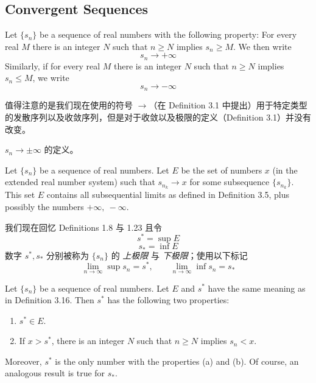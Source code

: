 \documentclass[../poma-notes.tex]{subfiles}
\begin{document}
\subsection*{Convergent Sequences}

\begin{definition}
  Let $\{s_n\}$ be a sequence of real numbers with the following property: For every real $M$ there is an integer $N$ such that $n \ge N$
  implies $s_n \ge M$. We then write
  \[ s_n \to + \infty \]
  Similarly, if for every real $M$ there is an integer $N$ such that $n \ge N$ implies $s_n \le M$, we write
  \[ s_n \to - \infty \]
\end{definition}

值得注意的是我们现在使用的符号 $\to$（在 Definition 3.1 中提出）用于特定类型的发散序列以及收敛序列，但是对于收敛以及极限的定义（Definition 3.1）并没有改变。

\anote $s_n \to \pm \infty$ 的定义。

\begin{definition}
  Let $\{s_n\}$ be a sequence of real numbers. Let $E$ be the set of numbers $x$ (in the extended real number system) such that
  $s_{n_k} \to x$ for some subsequence $\{s_{n_k}\}$. This set $E$ contains all subsequential limits as defined in Definition 3.5, plus
  possibly the numbers $+\infty,\ -\infty$.
\end{definition}

我们现在回忆 Definitions 1.8 与 1.23 且令
\[ s^* = \sup E \]
\[ s_* = \inf E \]
数字 $s^*, s_*$ 分别被称为 $\{s_n\}$ 的 \textit{上极限} 与 \textit{下极限}；使用以下标记
\[ \lim_{n \to \infty} \sup s_n = s^*, \qquad \lim_{n \to \infty} \inf s_n = s_* \]

\begin{theorem}
  Let $\{s_n\}$ be a sequence of real numbers. Let $E$ and $s^*$ have the same meaning as in Definition 3.16. Then $s^*$ has the following
  two properties:
  \begin{enumerate}[label=(\alph*)]
    \item $s^* \in E$.
    \item If $x > s^*$, there is an integer $N$ such that $n \ge N$ implies $s_n < x$.
  \end{enumerate}
  Moreover, $s^*$ is the only number with the properties (a) and (b). Of course, an analogous result is true for $s_*$.
\end{theorem}
\end{document}
